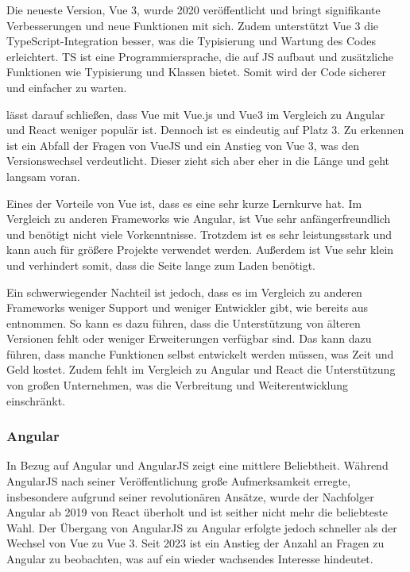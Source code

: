 \documentclass[biblatex]{lni}
\begin{document}
Die neueste Version, Vue 3,
wurde 2020 veröffentlicht und bringt signifikante Verbesserungen und neue Funktionen mit sich. \cite{vue}
Zudem unterstützt Vue 3 die TypeScript-Integration besser, was die Typisierung und Wartung des Codes erleichtert.
\ac{TS} ist eine Programmiersprache, die auf \ac{JS} aufbaut und zusätzliche Funktionen wie Typisierung und Klassen bietet. \cite{ts}
Somit wird der Code sicherer und einfacher zu warten.

 lässt darauf schließen,
dass Vue mit Vue.js und Vue3 im Vergleich zu Angular und React weniger populär ist.
Dennoch ist es eindeutig auf Platz 3.
Zu erkennen ist ein Abfall der Fragen von VueJS und ein Anstieg von Vue 3, was den Versionswechsel verdeutlicht.
Dieser zieht sich aber eher in die Länge und geht langsam voran.

Eines der Vorteile von Vue ist, dass es eine sehr kurze Lernkurve hat. \cite{Dev}
Im Vergleich zu anderen Frameworks wie Angular,
ist Vue sehr anfängerfreundlich und benötigt nicht viele Vorkenntnisse.
Trotzdem ist es sehr leistungsstark und kann auch für größere Projekte verwendet werden.
Außerdem ist Vue sehr klein und verhindert somit, dass die Seite lange zum Laden benötigt.

Ein schwerwiegender Nachteil ist jedoch, dass es im Vergleich zu anderen Frameworks weniger Support und weniger Entwickler gibt, wie bereits aus  entnommen. \cite{BStack}
So kann es dazu führen, dass die Unterstützung von älteren Versionen fehlt oder weniger Erweiterungen verfügbar sind.
Das kann dazu führen, dass manche Funktionen selbst entwickelt werden müssen, was Zeit und Geld kostet.
Zudem fehlt im Vergleich zu Angular und React die Unterstützung von großen Unternehmen, was die Verbreitung und Weiterentwicklung einschränkt.

\subsubsection{Angular}

In Bezug auf Angular und AngularJS zeigt  eine mittlere Beliebtheit.
Während AngularJS nach seiner Veröffentlichung große Aufmerksamkeit erregte,
insbesondere aufgrund seiner revolutionären Ansätze,
wurde der Nachfolger Angular ab 2019 von React überholt und ist seither nicht mehr die beliebteste Wahl.
Der Übergang von AngularJS zu Angular erfolgte jedoch schneller als der Wechsel von Vue zu Vue 3.
Seit 2023 ist ein Anstieg der Anzahl an Fragen zu Angular zu beobachten,
was auf ein wieder wachsendes Interesse hindeutet.
\end{document}
